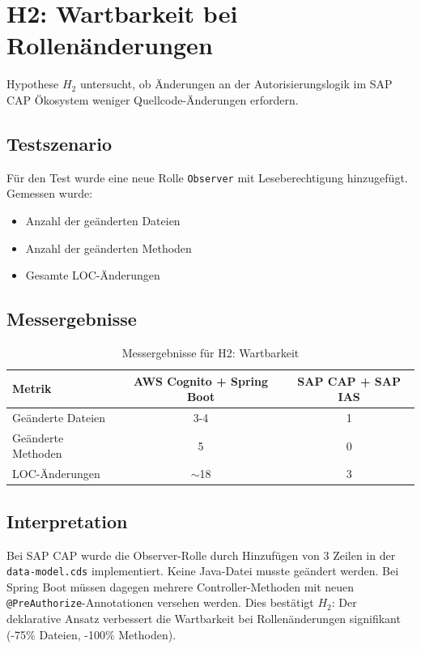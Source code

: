\section{H2: Wartbarkeit bei Rollenänderungen}

Hypothese $H_2$ untersucht, ob Änderungen an der Autorisierungslogik im \ac{SAP
CAP} Ökosystem weniger Quellcode-Änderungen erfordern.

\subsection{Testszenario}

Für den Test wurde eine neue Rolle \texttt{Observer} mit Leseberechtigung
hinzugefügt. Gemessen wurde:
\begin{itemize}
    \item Anzahl der geänderten Dateien
    \item Anzahl der geänderten Methoden
    \item Gesamte LOC-Änderungen
\end{itemize}

\subsection{Messergebnisse}

\begin{table}[h]
    \centering
    \begin{tabular}{|l|c|c|}
        \hline
        \textbf{Metrik} & \textbf{AWS Cognito + Spring Boot}  & \textbf{SAP CAP + SAP IAS}  \\
        \hline
        Geänderte Dateien & 3-4 & 1 \\
        \hline
        Geänderte Methoden  & 5 & 0 \\
        \hline
        LOC-Änderungen  & $\sim$18  & 3 \\
        \hline
    \end{tabular}
    \caption{Messergebnisse für H2: Wartbarkeit}
    \label{tab:h2_ergebnisse}
\end{table}

\subsection{Interpretation}

Bei \ac{SAP CAP} wurde die Observer-Rolle durch Hinzufügen von 3 Zeilen in der
\texttt{data-model.cds} implementiert. Keine Java-Datei musste geändert werden.
Bei Spring Boot müssen dagegen mehrere Controller-Methoden mit neuen
\texttt{@PreAuthorize}-Annotationen versehen werden. Dies bestätigt $H_2$: Der
deklarative Ansatz verbessert die Wartbarkeit bei Rollenänderungen signifikant
(-75\% Dateien, -100\% Methoden).



